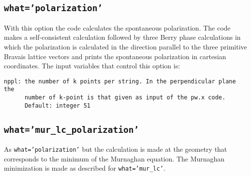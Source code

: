 \documentclass[12pt,a4paper]{article}
\begin{document}
\subsection{\texttt{what='polarization'}}
With this option the code calculates the spontaneous polarization.
The code makes a self-consistent calculation followed by three Berry
phase calculations in which the polarization is calculated in the
direction parallel to the three primitive Bravais lattice vectors and 
prints the spontaneous polarization in cartesian coordinates.
The input variables that control this option is:
\begin{verbatim}
nppl: the number of k points per string. In the perpendicular plane the
      number of k-point is that given as input of the pw.x code.
      Default: integer 51
\end{verbatim}

\subsection{\texttt{what='mur\_lc\_polarization'}}
As \texttt{what='polarization'} but the calculation is made at the
geometry that corresponds to the minimum of the Murnaghan equation. The
Murnaghan minimization is made as described for \texttt{what='mur\_lc'}.
\end{document}
